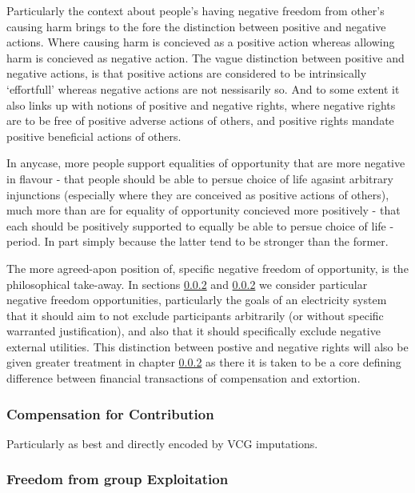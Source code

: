 Particularly the context about people's having negative freedom from other's causing harm brings to the fore the distinction between positive and negative actions.
Where causing harm is concieved as a positive action whereas allowing harm is concieved as negative action.
The vague distinction between positive and negative actions, is that positive actions are considered to be intrinsically `effortfull' whereas negative actions are not nessisarily so.\cite{Mossel2009} And to some extent it also links up with notions of positive and negative rights, where negative rights are to be free of positive adverse actions of others, and positive rights mandate positive beneficial actions of others.

In anycase, more people support equalities of opportunity that are more negative in flavour - that people should be able to persue choice of life agasint arbitrary injunctions (especially where they are conceived as positive actions of others), 
much more than are for equality of opportunity concieved more positively - that each should be positively supported to equally be able to persue choice of life -period.
In part simply because the latter tend to be stronger than the former.


The more agreed-apon position of, specific negative freedom of opportunity, is the philosophical take-away.
In sections \ref{} and \ref{} we consider particular negative freedom opportunities, particularly the goals of an electricity system that it should aim to not exclude participants arbitrarily (or without specific warranted justification), and also that it should specifically exclude negative external utilities.
This distinction between postive and negative rights will also be given greater treatment in chapter \ref{} as there it is taken to be a core defining difference between financial transactions of compensation and extortion.







\subsubsection{Compensation for Contribution}

Particularly as best and directly encoded by VCG imputations.

\subsubsection{Freedom from group Exploitation}

